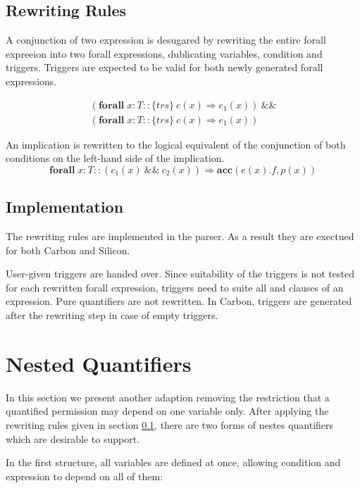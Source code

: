 \documentclass[12pt]{article}
\begin{document}
\subsection{Rewriting Rules}
\label{rewriting}
A conjunction of two expression is desugared by rewriting the entire forall expreeion into two forall expressions, dublicating variables, condition and triggers. Triggers are expected to be valid for both newly generated forall expressions.

\begin{equation}
\begin{aligned}
	(\mathbf{forall} \; x:T :: \{trs\}\   c(x)  \Rightarrow e_1(x)) \ \&\& \\
	(\mathbf{forall} \; x:T :: \{trs\}\   c(x) \Rightarrow  e_1(x))
\end{aligned}
\end{equation}

An implication is rewritten to the logical equivalent of the conjunction of both conditions on the left-hand side of the implication.
\begin{equation}
	\mathbf{forall} \; x:T ::( c_1(x) \:\&\&\: c_2(x)) \Rightarrow \mathbf{acc}(e(x).f, p(x))
\end{equation}

\subsection{Implementation}
The rewriting rules are implemented in the parser. As a result they are exectued for both Carbon and Silicon.

User-given triggers are handed over. Since suitability of the triggers is not tested for each rewritten forall expression, triggers need to suite all and clauses of an expression. Pure quantifiers are not rewritten. 
 In Carbon, triggers are generated after the rewriting step in case of empty triggers.


\section{Nested Quantifiers}
In this section we present another adaption removing the restriction that a quantified permission may depend on one variable only. After applying the rewriting rules given in section \ref{rewriting}, there are two forms of nestes quantifiers which are desirable to support.

In the first structure, all variables are defined at once, allowing condition and expression to depend on all of them:\\
\end{document}
